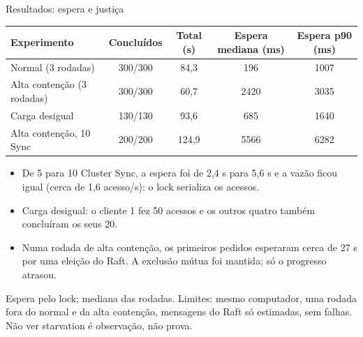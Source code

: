 \documentclass[aspectratio=169,11pt]{beamer}
\begin{document}
\begin{frame}{Resultados: espera e justiça}
\small
\setlength{\tabcolsep}{4pt}
\renewcommand{\arraystretch}{1.2}
\begin{tabular}{@{}lcccc@{}}
\toprule
\textbf{Experimento} & \textbf{Concluídos} & \textbf{Total (s)} & \textbf{Espera mediana (ms)} & \textbf{Espera p90 (ms)}\\
\midrule
Normal (3 rodadas) & 300/300 & 84,3 & 196 & 1007\\
Alta contenção (3 rodadas) & 300/300 & 60,7 & 2420 & 3035\\
Carga desigual & 130/130 & 93,6 & 685 & 1640\\
Alta contenção, 10 Sync & 200/200 & 124,9 & 5566 & 6282\\
\bottomrule
\end{tabular}
\vspace{0.2cm}
\begin{itemize}\setlength\itemsep{0.08cm}\small
\item De 5 para 10 Cluster Sync, a espera foi de 2,4 s para 5,6 s e a vazão ficou igual (cerca de 1,6 acesso/s): o lock serializa os acessos.
\item Carga desigual: o cliente 1 fez 50 acessos e os outros quatro também concluíram os seus 20.
\item Numa rodada de alta contenção, os primeiros pedidos esperaram cerca de 27 s por uma eleição do Raft. A exclusão mútua foi mantida; só o progresso atrasou.
\end{itemize}
{\scriptsize Espera pelo lock; mediana das rodadas. Limites: mesmo computador, uma rodada fora do normal e da alta contenção, mensagens do Raft só estimadas, sem falhas. Não ver starvation é observação, não prova.}
\end{frame}
\end{document}
